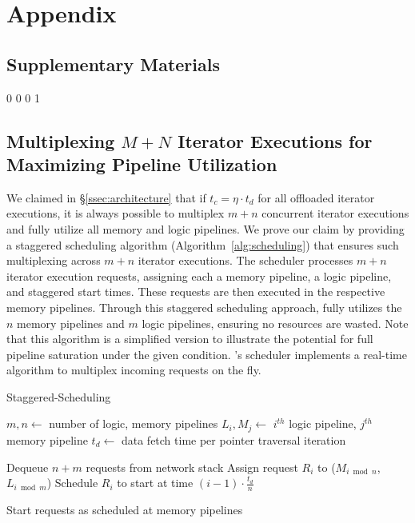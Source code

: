 \chapter{Appendix}

\section*{Supplementary Materials}

\vspace{15pt}
\renewcommand\thesection{\Alph{section}.}
\renewcommand\thesubsection{\Alph{section}.\arabic{subsection}}
\setcounter {subfigure} {0}
\setcounter {figure} {0}
\setcounter {section} {0}
\setcounter {page} {1}

\section{Multiplexing $M+N$ Iterator Executions for Maximizing Pipeline Utilization}

We claimed in \S\ref{ssec:architecture} that if $t_c = \eta \cdot t_d$ for all offloaded iterator executions, it is always possible to multiplex $m + n$ concurrent iterator executions and fully utilize all memory and logic pipelines. We prove our claim by providing a staggered scheduling algorithm (Algorithm~\ref{alg:scheduling}) that ensures such multiplexing across $m+n$ iterator executions. The scheduler processes $m+n$ iterator execution requests, assigning each a memory pipeline, a logic pipeline, and staggered start times. These requests are then executed in the respective memory pipelines. Through this staggered scheduling approach, \name fully utilizes the $n$ memory pipelines and $m$ logic pipelines, ensuring no resources are wasted. Note that this algorithm is a simplified version to illustrate the potential for full pipeline saturation under the given condition. \name's scheduler implements a real-time algorithm to multiplex incoming requests on the fly.


\begin{algorithm}
\caption{Staggered-Scheduling}
\label{alg:scheduling}
\begin{algorithmic}[1]
\State $m, n \gets$ number of logic, memory pipelines
\State $L_i, M_j \gets$ $i^{th}$ logic pipeline, $j^{th}$ memory pipeline
\State $t_d \gets$ data fetch time per pointer traversal iteration

    \State Dequeue $n + m$ requests from network stack
        \State Assign request $R_i$ to ($M_{i \bmod n}$,  $L_{i \bmod m}$)
        \State Schedule $R_i$ to start at time $(i-1) \cdot \frac{t_d}{n}$
        
        
    \EndFor
    
    \State Start requests as scheduled at memory pipelines
    
\EndWhile
\end{algorithmic}
\end{algorithm}


